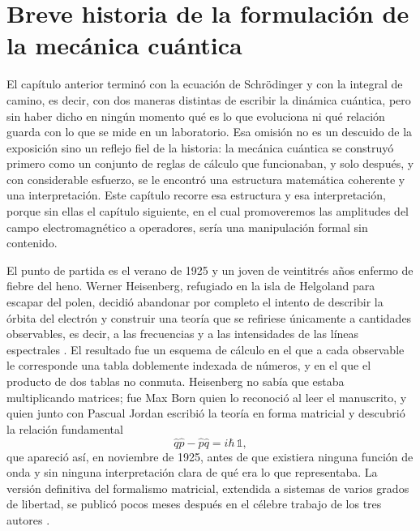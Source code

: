 \section{Breve historia de la formulación de la mecánica cuántica}

    El capítulo anterior terminó con la ecuación de Schrödinger y con la integral de camino, es decir, con dos maneras distintas de escribir la dinámica cuántica, pero sin haber dicho en ningún momento qué es lo que evoluciona ni qué relación guarda con lo que se mide en un laboratorio. Esa omisión no es un descuido de la exposición sino un reflejo fiel de la historia: la mecánica cuántica se construyó primero como un conjunto de reglas de cálculo que funcionaban, y solo después, y con considerable esfuerzo, se le encontró una estructura matemática coherente y una interpretación. Este capítulo recorre esa estructura y esa interpretación, porque sin ellas el capítulo siguiente, en el cual promoveremos las amplitudes del campo electromagnético a operadores, sería una manipulación formal sin contenido.

    El punto de partida es el verano de 1925 y un joven de veintitrés años enfermo de fiebre del heno. Werner Heisenberg, refugiado en la isla de Helgoland para escapar del polen, decidió abandonar por completo el intento de describir la órbita del electrón y construir una teoría que se refiriese únicamente a cantidades observables, es decir, a las frecuencias y a las intensidades de las líneas espectrales \citep{heisenberg1925umdeutung}. El resultado fue un esquema de cálculo en el que a cada observable le corresponde una tabla doblemente indexada de números, y en el que el producto de dos tablas no conmuta. Heisenberg no sabía que estaba multiplicando matrices; fue Max Born quien lo reconoció al leer el manuscrito, y quien junto con Pascual Jordan escribió la teoría en forma matricial y descubrió la relación fundamental \citep{bornjordan1925zur}
    \begin{equation}\label{eq:ConmutadorHistorico}
        \hat{q}\hat{p} - \hat{p}\hat{q} = i\hbar\,\mathbb{1},
    \end{equation}
    que apareció así, en noviembre de 1925, antes de que existiera ninguna función de onda y sin ninguna interpretación clara de qué era lo que representaba. La versión definitiva del formalismo matricial, extendida a sistemas de varios grados de libertad, se publicó pocos meses después en el célebre trabajo de los tres autores \citep{bornheisenbergjordan1926}.

